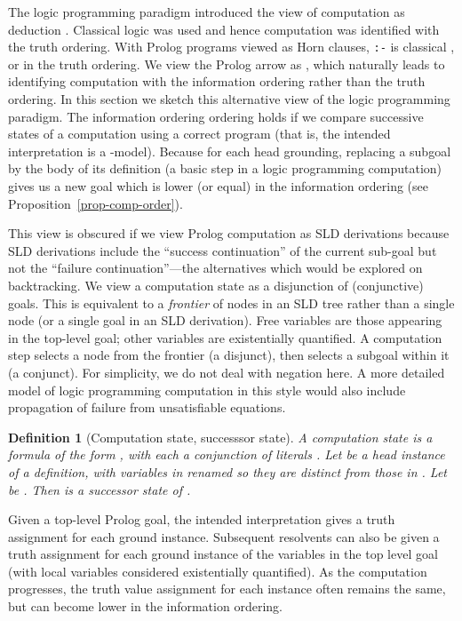 \documentclass{tlp}
\newtheorem{definition}{Definition}
\begin{document}
The logic programming paradigm introduced the view of computation as
deduction \cite{Kow80}.  Classical logic was used and hence computation
was identified with the truth ordering.  With Prolog programs viewed
as Horn clauses, \texttt{:-} is classical , or  in
the truth ordering.  We view the Prolog arrow as ,
which naturally leads to identifying computation with the information
ordering rather than the truth ordering.  In this section we sketch this
alternative view of the logic programming paradigm.  The information
ordering ordering holds if we compare
successive states of a computation using a correct program (that is, the
intended interpretation is a -model).  Because  for each head grounding, replacing a subgoal by the body
of its definition (a basic step in a logic programming computation)
gives us a new goal which is lower (or equal) in the information
ordering (see Proposition~\ref{prop-comp-order}).

This view is obscured if we view Prolog computation as SLD derivations
because SLD derivations include the ``success continuation'' of the
current sub-goal but not the ``failure continuation''---the alternatives
which would be explored on backtracking.  We view a computation state
as a disjunction of (conjunctive) goals.  This is equivalent to a
\emph{frontier} of nodes in an SLD tree rather than a single node (or a
single goal in an SLD derivation).  Free variables are those appearing
in the top-level goal; other variables are existentially quantified.
A computation step selects a node from the frontier (a disjunct), then
selects a subgoal within it (a conjunct).  For simplicity, we do not
deal with negation here.  A more detailed model of logic programming
computation in this style would also include propagation of failure from
unsatisfiable equations.

\begin{definition}[Computation state, successsor state]
A computation state  is a formula of the form
, with each 
a conjunction of literals
.
Let  be a
head instance of a definition, with variables in 
renamed so they are distinct from those in .
Let  be
.  Then
 is a successor state of .
\end{definition}

Given a top-level Prolog goal, the intended interpretation gives a
truth assignment for each ground instance.  Subsequent resolvents can
also be given a truth assignment for each ground instance of the
variables in the top level goal (with local variables considered
existentially quantified).  As the computation progresses, the
truth value assignment for each instance often remains the same,
but can become lower in the information ordering.
\end{document}

